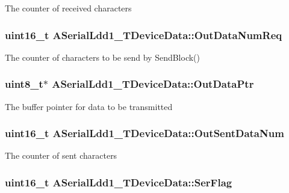 The counter of received characters \hypertarget{struct_a_serial_ldd1___t_device_data_a075ec547a9bd9c9e41181966a6b9b203}{
\subsubsection[{Out\-Data\-Num\-Req}]{\setlength{\rightskip}{0pt plus 5cm}uint16\-\_\-t A\-Serial\-Ldd1\-\_\-\-T\-Device\-Data\-::\-Out\-Data\-Num\-Req}}\label{struct_a_serial_ldd1___t_device_data_a075ec547a9bd9c9e41181966a6b9b203}
The counter of characters to be send by Send\-Block() \hypertarget{struct_a_serial_ldd1___t_device_data_a2a004530c79852f3a438dd1deda07c3a}{
\subsubsection[{Out\-Data\-Ptr}]{\setlength{\rightskip}{0pt plus 5cm}uint8\-\_\-t$\ast$ A\-Serial\-Ldd1\-\_\-\-T\-Device\-Data\-::\-Out\-Data\-Ptr}}\label{struct_a_serial_ldd1___t_device_data_a2a004530c79852f3a438dd1deda07c3a}
The buffer pointer for data to be transmitted \hypertarget{struct_a_serial_ldd1___t_device_data_a84390528474a595546a2fbefdd3a63fd}{
\subsubsection[{Out\-Sent\-Data\-Num}]{\setlength{\rightskip}{0pt plus 5cm}uint16\-\_\-t A\-Serial\-Ldd1\-\_\-\-T\-Device\-Data\-::\-Out\-Sent\-Data\-Num}}\label{struct_a_serial_ldd1___t_device_data_a84390528474a595546a2fbefdd3a63fd}
The counter of sent characters \hypertarget{struct_a_serial_ldd1___t_device_data_affb5a6a3a2d0c0dc54c04a66b2e1ada0}{
\subsubsection[{Ser\-Flag}]{\setlength{\rightskip}{0pt plus 5cm}uint16\-\_\-t A\-Serial\-Ldd1\-\_\-\-T\-Device\-Data\-::\-Ser\-Flag}}\label{struct_a_serial_ldd1___t_device_data_affb5a6a3a2d0c0dc54c04a66b2e1ada0}
